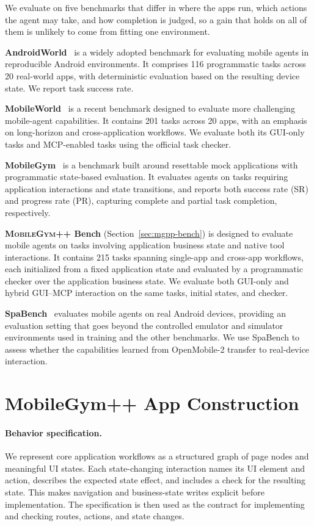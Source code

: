 We evaluate on five benchmarks that differ in where the apps run, which actions the agent may take, and how completion is judged, so a gain that holds on all of them is unlikely to come from fitting one environment.

\textbf{AndroidWorld}~\citep{rawles2025androidworld} is a widely adopted benchmark for evaluating mobile agents in reproducible Android environments. It comprises 116 programmatic tasks across 20 real-world apps, with deterministic evaluation based on the resulting device state. We report task success rate.

\textbf{MobileWorld}~\citep{kong2026mobileworld} is a recent benchmark designed to evaluate more challenging mobile-agent capabilities. It contains 201 tasks across 20 apps, with an emphasis on long-horizon and cross-application workflows. We evaluate both its GUI-only tasks and MCP-enabled tasks using the official task checker.

\textbf{MobileGym}~\citep{wu2026mobilegym} is a benchmark built around resettable mock applications with programmatic state-based evaluation. It evaluates agents on tasks requiring application interactions and state transitions, and reports both success rate (SR) and progress rate (PR), capturing complete and partial task completion, respectively.

\textbf{\textsc{MobileGym++} Bench} (Section~\ref{sec:mgpp-bench}) is designed to evaluate mobile agents on tasks involving application business state and native tool interactions. It contains 215 tasks spanning single-app and cross-app workflows, each initialized from a fixed application state and evaluated by a programmatic checker over the application business state. We evaluate both GUI-only and hybrid GUI--MCP interaction on the same tasks, initial states, and checker.

\textbf{SpaBench}~\citep{chen2024spa} evaluates mobile agents on real Android devices, providing an evaluation setting that goes beyond the controlled emulator and simulator environments used in training and the other benchmarks. We use SpaBench to assess whether the capabilities learned from OpenMobile-2 transfer to real-device interaction.

\section{MobileGym++ App Construction}
\label{app:mgpp-build}

\paragraph{Behavior specification.}
We represent core application workflows as a structured graph of page nodes and meaningful UI states. Each state-changing interaction names its UI element and action, describes the expected state effect, and includes a check for the resulting state. This makes navigation and business-state writes explicit before implementation. The specification is then used as the contract for implementing and checking routes, actions, and state changes.

